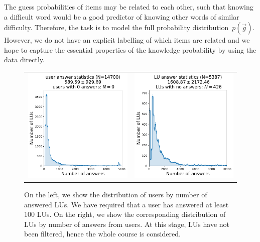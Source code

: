 The guess probabilities of items may be related to each other, such that knowing a difficult word would be a good predictor of knowing other words of similar difficulty. Therefore, the task is to model the full probability distribution~$p(\vec{g})$. However, we do not have an explicit labelling of which items are related and we hope to capture the essential properties of the knowledge probability by using the data directly.

\begin{figure}[ht]
\centering
\begin{tabular}{cc}
\includegraphics[width=0.5\linewidth]{figures/lingvist/user_answer_distribution.pdf} &
\includegraphics[width=0.5\linewidth]{figures/lingvist/lu_answer_distribution.pdf} \\
\end{tabular}
\caption[Distributions of guesses by LU and user]{On the left, we show the distribution of users by number of answered LUs. We have required that a user has answered at least 100 LUs. On the right, we show the corresponding distribution of LUs by number of answers from users. At this stage, LUs have not been filtered, hence the whole course is considered.} 
\label{fig:user_lu_distribution} 
\end{figure} 

